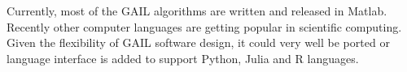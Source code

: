 Currently, most of the GAIL algorithms are written and released in Matlab. Recently other computer languages are getting popular in scientific computing. Given the flexibility of GAIL software design, it could very well be ported or language interface is added to support Python, Julia and R languages.
\begin{comment}
\begin{enumerate}

\item \texttt{assetPath}: A class of discretized stochastic processes that
model the values of an asset with respect to time

\item \texttt{optPayoff}: A class of option payoffs based on asset paths

\item \texttt{optPrice}: A class that computes the price of an option via
(quasi-)Monte Carlo methods.

\end{enumerate}


\alnote{Is there any future to support another popular scientific computing
language? like Julia ? Should we mention Fred's idea to bring other
collaborators? Or mention here interested collaborators contact us at--- ?}
\scnote{QMC Community software and OO classes}
\end{comment}
